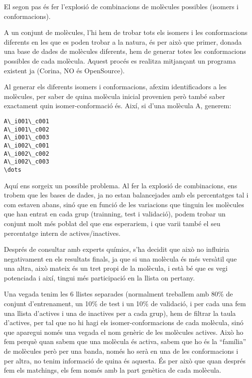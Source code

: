 \documentclass[titlepage,a4paper,12pt]{book}
\begin{document}

El segon pas és fer l'explosió de combinacions de molècules possibles (isomers i
conformacions).

A un conjunt de molècules, l'hi hem de trobar tots els isomers i les
conformacions diferents en les que es poden trobar a la natura, és per això que
primer, donada una base de dades de molècules diferents, hem de generar totes
les conformacions possibles de cada molècula.  Aquest procés es realitza
mitjançant un programa existent ja (Corina, NO és OpenSource).

Al generar els diferents isomers i conformacions, afexim identificadors a les
molècules, per saber de quina molècula inicial provenien però també saber
exactament quin isomer-conformació és.  Així, si d'una molècula A, generem:

\begin{verbatim}
A\_i001\_c001
A\_i001\_c002
A\_i001\_c003
A\_i002\_c001
A\_i002\_c002
A\_i002\_c003
\dots
\end{verbatim}


Aquí ens sorgeix un possible problema.  Al fer la explosió de combinacions, ens
trobem que les bases de dades, ja no estan balancejades amb els percentatges tal
i com estaven abans, sinó que en funció de les variacions que tinguin les
molècules que han entrat en cada grup (trainning, test i validació), podem
trobar un conjunt molt més poblat del que ens esperariem, i que varii també el
seu percentatge intern de actives/inactives.

Després de consultar amb experts químics, s'ha decidit que això no influiria
negativament en els resultats finals, ja que si una molècula és més versàtil que
una altra, això mateix és un tret propi de la molècula, i està bé que es vegi
potenciada i així, tingui més participació en la llista on pertany.

Una vegada tenim les 6 llistes separades (normalment treballem amb 80\% de
conjunt d'entrenament, un 10\% de test i un 10\% de validació, i per cada una
fem una llista d'actives i una de inactives per a cada grup),  hem de filtrar la
taula d'actives, per tal que no hi hagi els  isomer-conformacions de cada
molècula, sinó que aparegui només una vegada el nom genèric de les molècules
actives.  Això ho fem perquè quan sabem que una molècula és activa, sabem que ho
és la ``família'' de molècules però per una banda, només ho serà en una de les
conformacions i per altra, no tenim informació de quina és aquesta.  És per això
que quan després fem els matchings, els fem només amb la part genètica de cada
molècula.
\end{document}
